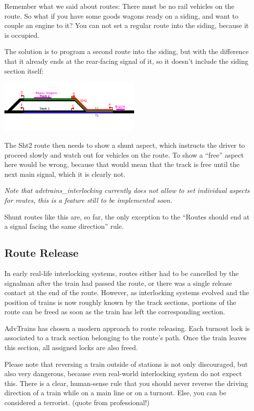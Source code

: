 \documentclass[english]{paper}
\begin{document}
Remember what we said about routes: There must be no rail vehicles
on the route. So what if you have some goods wagons ready on a siding,
and want to couple an engine to it? You can not set a regular route
into the siding, because it is occupied.

The solution is to program a second route into the siding, but with
the difference that it already ends at the rear-facing signal of it,
so it doesn't include the siding section itself:

\includegraphics[width=7cm]{9_home_moritz_Home_Projekte_Minetest_minetest_mods_advtrains_assets_lyx_img_route_ex3.png}

The Sht2 route then needs to show a shunt aspect, which instructs
the driver to proceed slowly and watch out for vehicles on the route.
To show a ``free'' aspect here would be wrong, because that would
mean that the track is free until the next main signal, which it is
clearly not.

\textit{Note that advtrains\_interlocking currently does not allow
to set individual aspects for routes, this is a feature still to be
implemented soon.}

Shunt routes like this are, so far, the only exception to the ``Routes
should end at a signal facing the same direction'' rule.

\subsection{Route Release}

In early real-life interlocking systems, routes either had to be cancelled
by the signalman after the train had passed the route, or there was
a single release contact at the end of the route. However, as interlocking
systems evolved and the position of trains is now roughly known by
the track sections, portions of the route can be freed as soon as
the train has left the corresponding section.

AdvTrains has chosen a modern approach to route releasing. Each turnout
lock is associated to a track section belonging to the route's path.
Once the train leaves this section, all assigned locks are also freed.

Please note that reversing a train outside of stations is not only
discouraged, but also very dangerous, because even real-world interlocking
system do not expect this. There is a clear, human-sense rule that
you should never reverse the driving direction of a train while on
a main line or on a turnout. Else, you can be considered a terrorist.
(quote from professional!)
\end{document}
